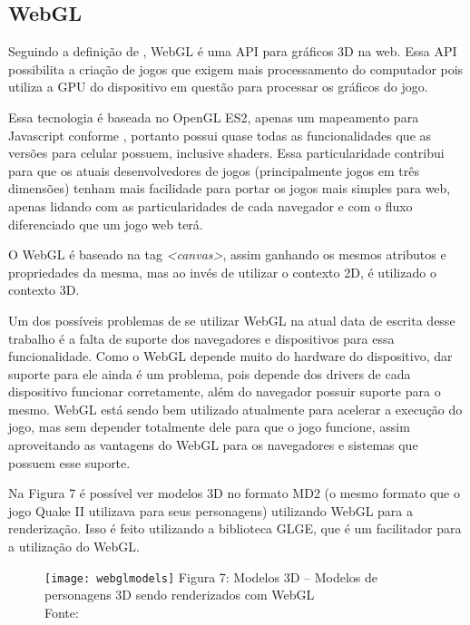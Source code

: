 \subsection{WebGL}

Seguindo a definição de , WebGL é uma API para gráficos 3D na web. Essa
API possibilita a criação de jogos que exigem mais processamento do
computador pois utiliza a GPU do dispositivo em questão para processar
os gráficos do jogo.

Essa tecnologia é baseada no OpenGL ES2, apenas um mapeamento para
Javascript conforme , portanto possui
quase todas as funcionalidades que as versões para celular possuem,
inclusive shaders. Essa particularidade contribui
para que os atuais desenvolvedores de jogos (principalmente jogos em
três dimensões) tenham mais facilidade para portar os jogos mais
simples para web, apenas lidando com as particularidades de cada
navegador e com o fluxo diferenciado que um jogo web terá.

O WebGL é baseado na tag \textit{<canvas>}, assim ganhando os mesmos
atributos e propriedades da mesma, mas ao invés de utilizar o contexto
2D, é utilizado o contexto 3D.

Um dos possíveis problemas de se utilizar WebGL na atual data
de escrita desse trabalho é a falta de suporte dos navegadores e
dispositivos para essa funcionalidade. Como o WebGL depende muito do
hardware do dispositivo, dar suporte para ele ainda é um problema,
pois depende dos drivers de cada dispositivo funcionar
corretamente, além do navegador possuir suporte para o mesmo.
WebGL está sendo bem utilizado atualmente para acelerar a execução do jogo,
mas sem depender totalmente dele para que o jogo funcione, assim
aproveitando as vantagens do WebGL para os navegadores e sistemas que
possuem esse suporte.

Na Figura 7 é possível ver modelos 3D no formato
MD2 (o mesmo formato que o jogo Quake II utilizava para seus
personagens) utilizando WebGL para a renderização. Isso é feito utilizando a
biblioteca GLGE, que é um facilitador para a utilização do WebGL.

\begin{figure}[H]
  \centering
	\texttt{[image: webglmodels]}
	\footnotesize\hspace{8\baselineskip}
	Figura 7: Modelos 3D {--} Modelos de personagens 3D sendo renderizados com WebGL \\
	Fonte: 
  \label{img:webglmodels}
\end{figure}

